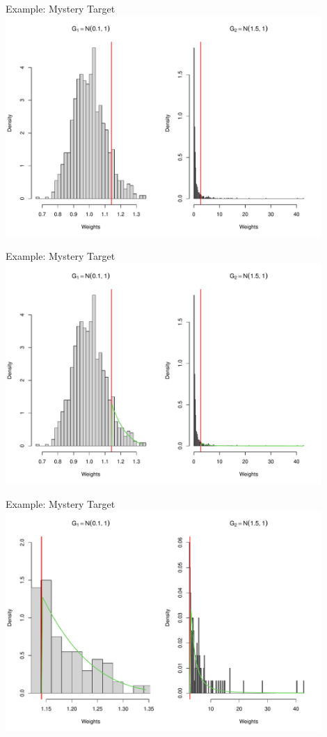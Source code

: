 \documentclass[14pt]{beamer}
\begin{document}
\begin{frame}{Example: Mystery Target}
    \centering
    \includegraphics[height=0.9\textheight, width=0.9\textwidth, keepaspectratio]{Figures/Wt Hist - Pareto Thresh.pdf}
\end{frame}

\begin{frame}{Example: Mystery Target}
    \centering
    \includegraphics[height=0.9\textheight, width=0.9\textwidth, keepaspectratio]{Figures/Wt Hist - Pareto Dens.pdf}
\end{frame}

\begin{frame}{Example: Mystery Target}
    \centering
    \includegraphics[height=0.9\textheight, width=0.9\textwidth, keepaspectratio]{Figures/Wt Hist - Pareto Dens Zoom.pdf}
\end{frame}
\end{document}
